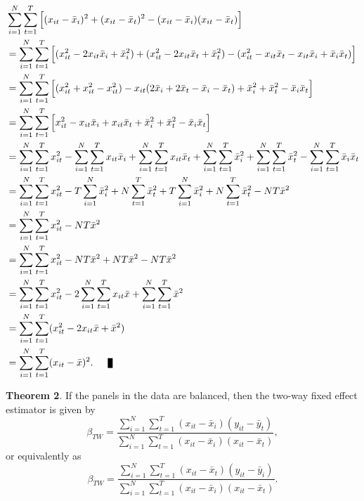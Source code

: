 \documentclass{article}[12pt]
\newenvironment{proof}[1][Proof.]{\begin{trivlist}
\item[\hskip \labelsep {\bfseries #1}]}{\end{trivlist}}
\newcommand{\qed}{\nobreak \ifvmode \relax \else
      \ifdim\lastskip<1.5em \hskip-\lastskip
      \hskip1.5em plus0em minus0.5em \fi \nobreak
      \vrule height0.75em width0.5em depth0.25em\fi}
\begin{document}
\begin{proof}
\begin{align}
& \sum_{i=1}^N \sum_{t=1}^T\Big[(x_{it}  - \bar{x}_i)^2 + (x_{it} - \bar{x}_t)^2 - (x_{it}  - \bar{x}_i)(x_{it} - \bar{x}_t)\Big]\nonumber\\
& = \sum_{i=1}^N \sum_{t=1}^T \Big[(x_{it}^2 - 2x_{it}\bar{x}_i + \bar{x}_i^2)+(x_{it}^2 - 2x_{it}\bar{x}_t  + \bar{x}_t^2) - (x_{it}^2 - x_{it}\bar{x}_t  - x_{it}\bar{x}_i + \bar{x}_i\bar{x}_t)\Big]\nonumber\\
& = \sum_{i=1}^N \sum_{t=1}^T \Big[(x_{it}^2  +x_{it}^2 - x_{it}^2) -  x_{it}(2\bar{x}_i  + 2\bar{x}_t  - \bar{x}_i - \bar{x}_t ) + \bar{x}_i^2 + \bar{x}_t^2 - \bar{x}_i\bar{x}_t\Big]\nonumber\\
& = \sum_{i=1}^N \sum_{t=1}^T \Big[x_{it}^2 -  x_{it}\bar{x}_i  + x_{it}\bar{x}_t + \bar{x}_i^2 + \bar{x}_t^2 - \bar{x}_i\bar{x}_t\Big]\nonumber\\
& = \sum_{i=1}^N \sum_{t=1}^T x_{it}^2 -  \sum_{i=1}^N \sum_{t=1}^Tx_{it}\bar{x}_i  + \sum_{i=1}^N \sum_{t=1}^Tx_{it}\bar{x}_t + \sum_{i=1}^N \sum_{t=1}^T\bar{x}_i^2 + \sum_{i=1}^N \sum_{t=1}^T\bar{x}_t^2 - \sum_{i=1}^N \sum_{t=1}^T\bar{x}_i\bar{x}_t\nonumber\\
& = \sum_{i=1}^N \sum_{t=1}^T x_{it}^2 -  T\sum_{i=1}^N\bar{x}_i^2  + N \sum_{t=1}^T\bar{x}_t^2 + T\sum_{i=1}^N \bar{x}_i^2 + N \sum_{t=1}^T\bar{x}_t^2 - NT\bar{x}^2\nonumber\\
& = \sum_{i=1}^N \sum_{t=1}^T x_{it}^2 - NT\bar{x}^2\nonumber\\
& = \sum_{i=1}^N \sum_{t=1}^T x_{it}^2 - NT\bar{x}^2 + NT\bar{x}^2 - NT\bar{x}^2\nonumber\\
& = \sum_{i=1}^N \sum_{t=1}^T x_{it}^2 - 2\sum_{i=1}^N \sum_{t=1}^T x_{it}\bar{x} +\sum_{i=1}^N \sum_{t=1}^T\bar{x}^2\nonumber\\
& = \sum_{i=1}^N \sum_{t=1}^T (x_{it}^2 - 2x_{it}\bar{x} +\bar{x}^2)\nonumber\\
& = \sum_{i=1}^N \sum_{t=1}^T (x_{it}-\bar{x})^2. \qed
\end{align}
\end{proof}
\textbf{Theorem 2}. If the panels in the data are balanced, then the two-way fixed effect estimator is given by
\begin{equation}
\beta_{TW} = \frac{\sum_{i=1}^N \sum_{t=1}^T(x_{it}  - \bar{x}_i)(y_{it} - \bar{y}_t)}{\sum_{i=1}^N \sum_{t=1}^T(x_{it}  - \bar{x}_i)(x_{it} - \bar{x}_t)},
\end{equation}
or equivalently as
\begin{equation}
\beta_{TW} = \frac{\sum_{i=1}^N \sum_{t=1}^T(x_{it}  - \bar{x}_t)(y_{it} - \bar{y}_i)}{\sum_{i=1}^N \sum_{t=1}^T(x_{it}  - \bar{x}_i)(x_{it} - \bar{x}_t)}.
\end{equation}
\end{document}

